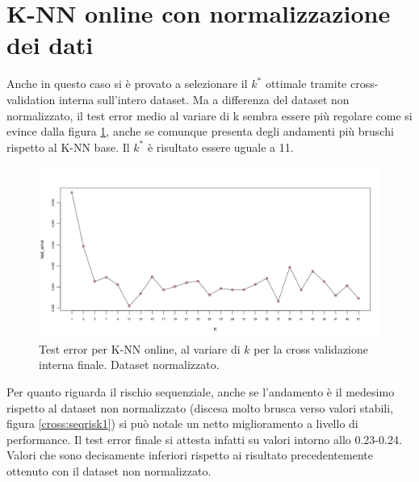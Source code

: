 \documentclass[fleqn,10pt]{SelfArx} %
\begin{document}
\section{K-NN online con normalizzazione dei dati}
Anche in questo caso si è provato a selezionare il $k^{*}$ ottimale tramite cross-validation interna sull'intero dataset. Ma a differenza del dataset non normalizzato, il test error medio al variare di k sembra essere più regolare come si evince dalla figura \ref{cross:final4}, anche se comunque presenta degli andamenti più bruschi rispetto al K-NN base. Il $k^{*}$ è risultato essere uguale  a 11.
\newline

\begin{figure}
\includegraphics[scale=0.27]{knn_online_norm/final_seq.png}
\caption{\footnotesize{Test error per K-NN online, al variare di $k$ per la cross validazione interna finale. Dataset normalizzato.}}
\label{cross:final4}
\end{figure}

Per quanto riguarda il rischio sequenziale, anche se l'andamento è il medesimo rispetto al dataset non normalizzato (discesa molto brusca verso valori stabili, figura \ref{cross:seqrisk1}) si può notale un netto miglioramento a livello di performance. Il test error finale si attesta infatti su valori intorno allo 0.23-0.24. Valori che sono decisamente inferiori rispetto ai risultato precedentemente ottenuto con il dataset non normalizzato. 
\end{document}
